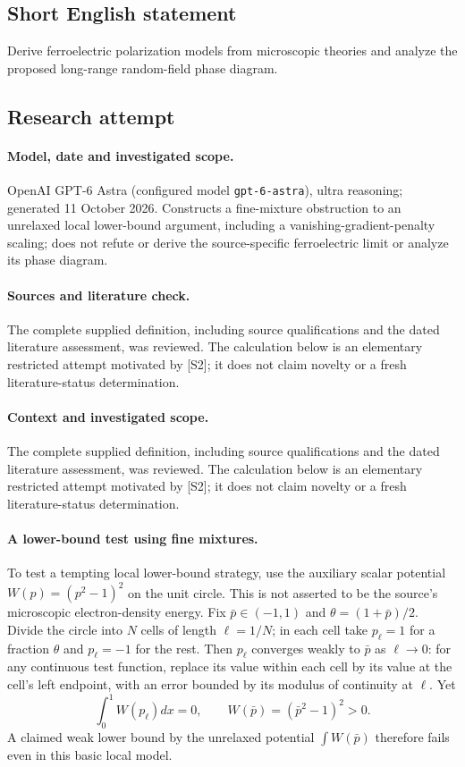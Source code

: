\documentclass[11pt]{article}
\begin{document}
\subsection{Short English statement}
Derive ferroelectric polarization models from microscopic theories and analyze the proposed long-range random-field phase diagram.
\subsection{Research attempt}
\paragraph{Model, date and investigated scope.}
OpenAI GPT-6 Astra (configured model \texttt{gpt-6-astra}), ultra reasoning; generated 11 October 2026. Constructs a fine-mixture obstruction to an unrelaxed local lower-bound argument, including a vanishing-gradient-penalty scaling; does not refute or derive the source-specific ferroelectric limit or analyze its phase diagram.

\paragraph{Sources and literature check.}
The complete supplied definition, including source qualifications and the dated literature assessment, was reviewed. The calculation below is an elementary restricted attempt motivated by [S2]; it does not claim novelty or a fresh literature-status determination.

\paragraph{Context and investigated scope.} The complete supplied definition, including source qualifications and the dated literature assessment, was reviewed. The calculation below is an elementary restricted attempt motivated by [S2]; it does not claim novelty or a fresh literature-status determination.

\paragraph{A lower-bound test using fine mixtures.}
To test a tempting local lower-bound strategy, use the auxiliary scalar potential $W(p)=(p^2-1)^2$ on the unit circle. This is not asserted to be the source's microscopic electron-density energy. Fix $\bar p\in(-1,1)$ and $\theta=(1+\bar p)/2$. Divide the circle into $N$ cells of length $\ell=1/N$; in each cell take $p_\ell=1$ for a fraction $\theta$ and $p_\ell=-1$ for the rest. Then $p_\ell$ converges weakly to $\bar p$ as $\ell\to0$: for any continuous test function, replace its value within each cell by its value at the cell's left endpoint, with an error bounded by its modulus of continuity at $\ell$. Yet
\[
 \int_0^1W(p_\ell)dx=0,
 \qquad W(\bar p)=(\bar p^2-1)^2>0.
\]
A claimed weak lower bound by the unrelaxed potential $\int W(\bar p)$ therefore fails even in this basic local model.
\end{document}
